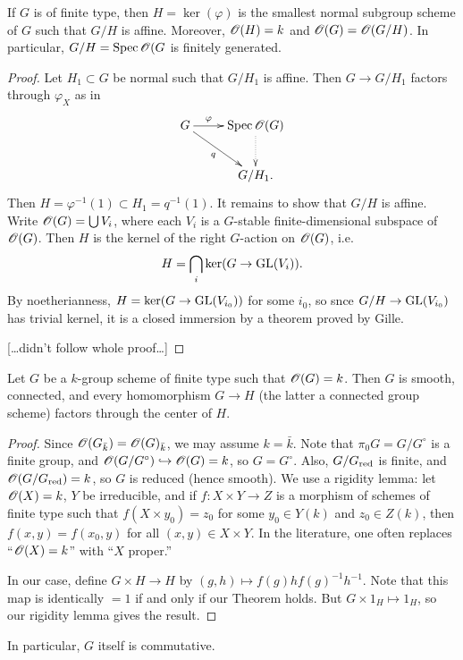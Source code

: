 \begin{theo}
If $G$ is of finite type, then $H=\ker(\varphi)$ is the smallest normal subgroup 
scheme of $G$ such that $G/H$ is affine. Moreover, $\mathscr{O}(H)=k$ and 
$\mathscr{O}(G)=\mathscr{O}(G/H)$. In particular, $G/H=\operatorname{Spec} \mathscr{O}(G$ is finitely generated. 
\end{theo}
\begin{proof}
Let $H_1\subset G$ be normal such that $G/H_1$ is affine. Then 
$G\to G/H_1$ factors through $\varphi_X$ as in 
\[\xymatrix{
  G \ar[r]^-\varphi \ar[dr]_-q 
    & \spectrum \sO(G) \ar@{.>}[d] \\
  & G/H_1 .
}\]
Then $H=\varphi^{-1}(1) \subset H_1=q^{-1}(1)$. It remains to show that $G/H$ is 
affine. Write $\mathscr{O}(G)=\bigcup V_i$, where each $V_i$ is a $G$-stable finite-dimensional 
subspace of $\mathscr{O}(G)$. Then $H$ is the kernel of the right $G$-action on 
$\mathscr{O}(G)$, i.e. 
\[
  H = \bigcap_i \ker(G \to \operatorname{GL}(V_i)) .
\]
By noetherianness, $H=\ker(G\to \operatorname{GL}(V_{i_0}))$ for some $i_0$, 
so snce $G/H \to \operatorname{GL}(V_{i_0})$ has trivial kernel, it is a 
closed immersion by a theorem proved by Gille. 

[\ldots didn't follow whole proof\ldots]
\end{proof}

\begin{theo}
Let $G$ be a $k$-group scheme of finite type such that $\mathscr{O}(G)=k$. Then $G$ 
is smooth, connected, and every homomorphism $G\to H$ (the latter a connected 
group scheme) factors through the center of $H$. 
\end{theo}
\begin{proof}
Since $\mathscr{O}(G_{\bar k}) = \mathscr{O}(G)_{\bar k}$, we may assume $k=\bar k$. Note that 
$\pi_0 G = G/G^\circ$ is a finite group, and 
$\mathscr{O}(G/G^\circ)\hookrightarrow \mathscr{O}(G)=k$, so $G=G^\circ$. Also, 
$G/G_{\mathrm{red}}$ is finite, and $\mathscr{O}(G/G_{\mathrm{red}})=k$, so $G$ is reduced (hence 
smooth). We use a rigidity lemma: let $\mathscr{O}(X)=k$, $Y$ be irreducible, and 
if $f:X\times Y\to Z$ is a morphism of schemes 
of finite type such that $f(X\times y_0)=z_0$ for some $y_0\in Y(k)$ and 
$z_0\in Z(k)$, then $f(x,y) = f(x_0,y)$ for all $(x,y)\in X\times Y$. In the 
literature, one often replaces ``$\mathscr{O}(X)=k$'' with ``$X$ proper.'' 

In our case, define $G\times H \to H$ by $(g,h)\mapsto f(g) h f(g)^{-1} h^{-1}$. 
Note that this map is identically $=1$ if and only if our Theorem holds. But 
$G\times 1_H\mapsto 1_H$, so our rigidity lemma gives the result. 
\end{proof}
In particular, $G$ itself is commutative. 

